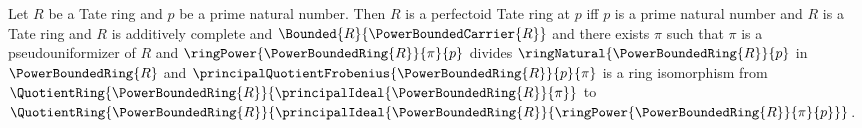 \begin{theorem}\label{perfectoid_tate_ring_iff}
    Let $R$ be a Tate ring and $p$ be a prime natural number.
    Then $R$ is a perfectoid Tate ring at $p$ iff
        $p$ is a prime natural number and
        $R$ is a Tate ring and
        $R$ is additively complete and
        $\Bounded{R}{\PowerBoundedCarrier{R}}$ and
        there exists $\pi$ such that
            $\pi$ is a pseudouniformizer of $R$ and
            $\ringPower{\PowerBoundedRing{R}}{\pi}{p}$ divides
                $\ringNatural{\PowerBoundedRing{R}}{p}$ in
                $\PowerBoundedRing{R}$ and
            $\principalQuotientFrobenius{
                    \PowerBoundedRing{R}}{p}{\pi}$
                is a ring isomorphism from
                $\QuotientRing{\PowerBoundedRing{R}}{
                    \principalIdeal{\PowerBoundedRing{R}}{\pi}}$ to
                $\QuotientRing{\PowerBoundedRing{R}}{
                    \principalIdeal{\PowerBoundedRing{R}}{
                        \ringPower{\PowerBoundedRing{R}}{\pi}{p}}}$.
\end{theorem}
